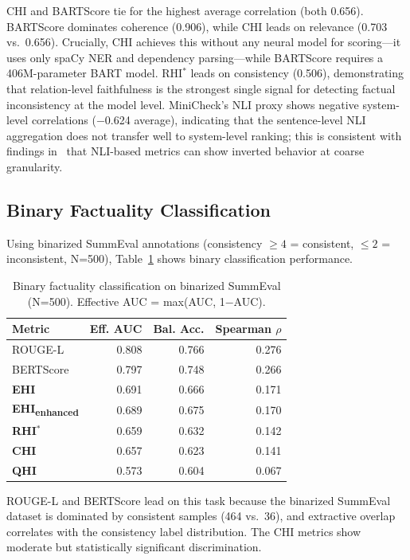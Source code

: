 \documentclass[11pt]{article}
\begin{document}
CHI and BARTScore tie for the highest average correlation (both 0.656). BARTScore dominates coherence (0.906), while CHI leads on relevance (0.703 vs.\ 0.656). Crucially, CHI achieves this without any neural model for scoring---it uses only spaCy NER and dependency parsing---while BARTScore requires a 406M-parameter BART model. RHI$^*$ leads on consistency (0.506), demonstrating that relation-level faithfulness is the strongest single signal for detecting factual inconsistency at the model level. MiniCheck's NLI proxy shows negative system-level correlations ($-$0.624 average), indicating that the sentence-level NLI aggregation does not transfer well to system-level ranking; this is consistent with findings in~\cite{honovich2022true} that NLI-based metrics can show inverted behavior at coarse granularity.


\subsection{Binary Factuality Classification}

Using binarized SummEval annotations (consistency $\geq 4$ = consistent, $\leq 2$ = inconsistent, N=500), Table~\ref{tab:aggrefact} shows binary classification performance.

\begin{table}[h]
\centering
\caption{Binary factuality classification on binarized SummEval (N=500). Effective AUC = max(AUC, 1$-$AUC).}
\label{tab:aggrefact}
\begin{tabular}{lrrr}
\toprule
\textbf{Metric} & \textbf{Eff. AUC} & \textbf{Bal. Acc.} & \textbf{Spearman $\rho$} \\
\midrule
ROUGE-L & 0.808 & 0.766 & 0.276 \\
BERTScore & 0.797 & 0.748 & 0.266 \\
\textbf{EHI} & 0.691 & 0.666 & 0.171 \\
\textbf{EHI\textsubscript{enhanced}} & 0.689 & 0.675 & 0.170 \\
\textbf{RHI$^*$} & 0.659 & 0.632 & 0.142 \\
\textbf{CHI} & 0.657 & 0.623 & 0.141 \\
\textbf{QHI} & 0.573 & 0.604 & 0.067 \\
\bottomrule
\end{tabular}
\end{table}

ROUGE-L and BERTScore lead on this task because the binarized SummEval dataset is dominated by consistent samples (464 vs.\ 36), and extractive overlap correlates with the consistency label distribution. The CHI metrics show moderate but statistically significant discrimination.
\end{document}

